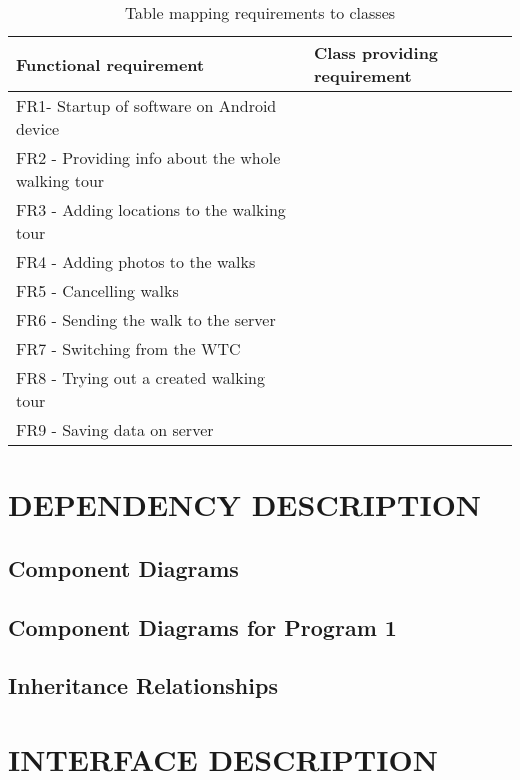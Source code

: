 \documentclass{project}
\begin{document}
\begin{table}[htp]
	\caption{Table mapping requirements to classes}
	\centering
    \begin{tabular}{l|l}
    \hline
    \hline
    Functional requirement                            & Class providing requirement \\   [0.5ex] \hline
    FR1- Startup of software on Android device        & ~                           \\
    FR2 - Providing info about the whole walking tour & ~                           \\
    FR3 - Adding locations to the walking tour        & ~                           \\
    FR4 - Adding photos to the walks                  & ~                           \\
    FR5 - Cancelling walks                            & ~                           \\
    FR6 - Sending the walk to the server              & ~                           \\
    FR7 - Switching from the WTC                      & ~                           \\
    FR8 - Trying out a created walking tour           & ~                           \\
    FR9 - Saving data on server                       & ~                           \\
    \end{tabular}
\end{table}

\section{DEPENDENCY DESCRIPTION}
\subsection{Component Diagrams}
\subsection{Component Diagrams for Program 1}
\subsection{Inheritance Relationships}

\section{INTERFACE DESCRIPTION}
\end{document}

